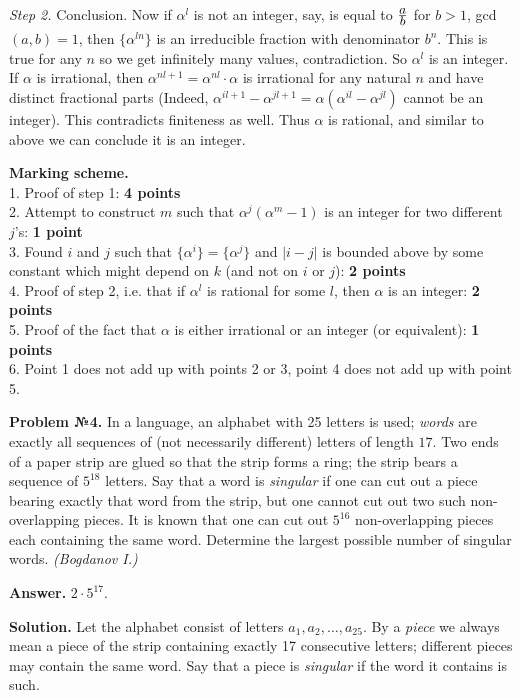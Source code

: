\documentclass[12pt]{article}
\def\frac#1#2{\mathchoice{#1\over#2}{\hbox{\small$#1$}\over\mathstrut\hbox{\small$#2$}}{#1\over#2}{#1\over#2}}
\def \Problem#1{\par \bigskip \textbf{Problem №{#1}. }}
\def \solution{\par \bigskip \textbf{Solution. }}
\def \answer{\par \bigskip \textbf{Answer. }}
\def \marking{\par \bigskip \textbf{Marking scheme. }}
\begin{document}
\textit{Step 2.} Conclusion. Now if $\alpha^l$ is not an integer, say, is equal to $\frac{a}{b}$ for $b>1$, gcd$(a,b)=1$, then $\{\alpha^{ln}\}$ is an irreducible fraction with denominator $b^n$. This is true for any $n$ so we get infinitely many values, contradiction. So $\alpha^l$ is an integer. If $\alpha$ is irrational, then $\alpha^{nl+1}=\alpha^{nl}\cdot\alpha$ is irrational for any natural $n$ and have distinct fractional parts (Indeed, $\alpha^{il+1}-\alpha^{jl+1}=\alpha (\alpha^{il}-\alpha^{jl})$ cannot be an integer). This contradicts finiteness as well. Thus $\alpha$ is rational, and similar to above we can conclude it is an integer.


\marking
\\ 1. Proof of step 1: \dotfill \textbf{ 4 points}
\\ 2. Attempt to construct $m$ such that $\alpha^j(\alpha^m-1)$ is an integer for two different $j$'s: \dotfill \textbf{ 1 point}
\\ 3. Found $i$ and $j$ such that $\{\alpha^i\}=\{\alpha^j\}$ and $|i-j|$ is bounded above by some constant which might depend on $k$ (and not on $i$ or $j$): \dotfill \textbf{2 points}
\\ 4. Proof of step 2, i.e. that if $\alpha^l$ is rational for some $l$, then $\alpha$ is an integer: \dotfill \textbf{ 2 points}
\\ 5. Proof of the fact that $\alpha$ is either irrational or an integer (or equivalent): \dotfill \textbf{ 1 points}
\\ 6. Point 1 does not add up with points 2 or 3, point 4 does not add up with point 5.

\newpage
\Problem{4} In a language, an alphabet with 25 letters is used; \emph{words} are exactly all sequences of (not necessarily different) letters of length $17$. Two ends of a paper strip are glued so that the strip forms a ring; the strip bears a sequence of $5^{18}$ letters. Say that a word is \emph{singular} if one can cut out a piece bearing exactly that word from the strip, but one cannot cut out two such non-overlapping pieces. It is known that one can cut out $5^{16}$ non-overlapping pieces each containing the same word. Determine the largest possible number of singular words. \textit{(Bogdanov I.)}

\answer $2\cdot 5^{17}$.

\solution Let the alphabet consist of letters $a_1,a_2,\dots,a_{25}$. By a \emph{piece} we always mean a piece of the strip containing exactly 17 consecutive letters; different pieces may contain the same word. Say that a piece is \emph{singular} if the word it contains is such.
\end{document}
